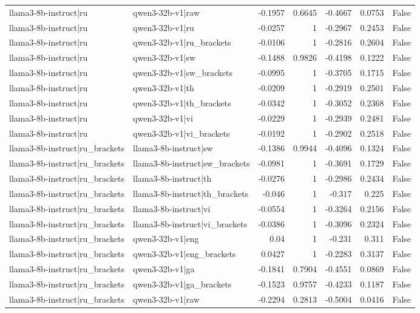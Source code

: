 \begin{table}
\begin{tabular}{l l r r r r l}
llama3-8b-instruct|ru & qwen3-32b-v1|raw & -0.1957 & 0.6645 & -0.4667 & 0.0753 & False \\
llama3-8b-instruct|ru & qwen3-32b-v1|ru & -0.0257 & 1 & -0.2967 & 0.2453 & False \\
llama3-8b-instruct|ru & qwen3-32b-v1|ru_brackets & -0.0106 & 1 & -0.2816 & 0.2604 & False \\
llama3-8b-instruct|ru & qwen3-32b-v1|sw & -0.1488 & 0.9826 & -0.4198 & 0.1222 & False \\
llama3-8b-instruct|ru & qwen3-32b-v1|sw_brackets & -0.0995 & 1 & -0.3705 & 0.1715 & False \\
llama3-8b-instruct|ru & qwen3-32b-v1|th & -0.0209 & 1 & -0.2919 & 0.2501 & False \\
llama3-8b-instruct|ru & qwen3-32b-v1|th_brackets & -0.0342 & 1 & -0.3052 & 0.2368 & False \\
llama3-8b-instruct|ru & qwen3-32b-v1|vi & -0.0229 & 1 & -0.2939 & 0.2481 & False \\
llama3-8b-instruct|ru & qwen3-32b-v1|vi_brackets & -0.0192 & 1 & -0.2902 & 0.2518 & False \\
llama3-8b-instruct|ru_brackets & llama3-8b-instruct|sw & -0.1386 & 0.9944 & -0.4096 & 0.1324 & False \\
llama3-8b-instruct|ru_brackets & llama3-8b-instruct|sw_brackets & -0.0981 & 1 & -0.3691 & 0.1729 & False \\
llama3-8b-instruct|ru_brackets & llama3-8b-instruct|th & -0.0276 & 1 & -0.2986 & 0.2434 & False \\
llama3-8b-instruct|ru_brackets & llama3-8b-instruct|th_brackets & -0.046 & 1 & -0.317 & 0.225 & False \\
llama3-8b-instruct|ru_brackets & llama3-8b-instruct|vi & -0.0554 & 1 & -0.3264 & 0.2156 & False \\
llama3-8b-instruct|ru_brackets & llama3-8b-instruct|vi_brackets & -0.0386 & 1 & -0.3096 & 0.2324 & False \\
llama3-8b-instruct|ru_brackets & qwen3-32b-v1|eng & 0.04 & 1 & -0.231 & 0.311 & False \\
llama3-8b-instruct|ru_brackets & qwen3-32b-v1|eng_brackets & 0.0427 & 1 & -0.2283 & 0.3137 & False \\
llama3-8b-instruct|ru_brackets & qwen3-32b-v1|ga & -0.1841 & 0.7904 & -0.4551 & 0.0869 & False \\
llama3-8b-instruct|ru_brackets & qwen3-32b-v1|ga_brackets & -0.1523 & 0.9757 & -0.4233 & 0.1187 & False \\
llama3-8b-instruct|ru_brackets & qwen3-32b-v1|raw & -0.2294 & 0.2813 & -0.5004 & 0.0416 & False \\

\end{tabular}
\end{table}
